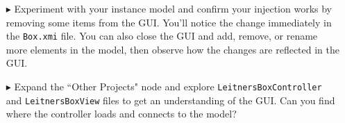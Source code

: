 \begin{itemize}
\vspace{1cm}

\item[$\blacktriangleright$] Experiment with your instance model and confirm your injection works by removing some items from the GUI.  You'll notice the change
immediately in the \texttt{Box.xmi} file. You can also close the GUI and add, remove, or rename more elements in the model, then observe how the changes are
reflected in the GUI.

\vspace{0.5cm}

\item[$\blacktriangleright$] Expand the ``Other Projects" node and explore \texttt{LeitnersBoxController} and \texttt{LeitnersBoxView} files to get an
understanding of the GUI. Can you find where the controller loads and connects to the model?

\end{itemize}
